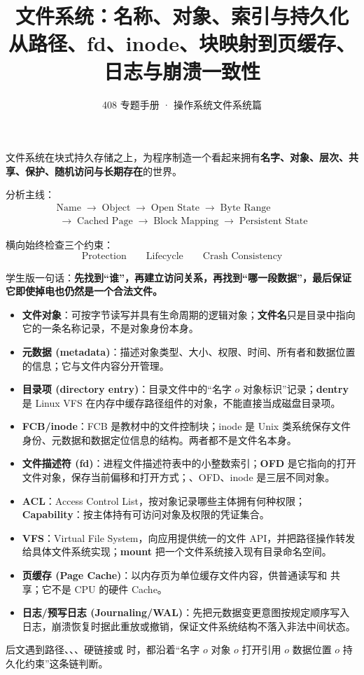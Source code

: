\documentclass[11pt,a4paper]{ctexart}
\title{\vspace{-1.2cm}\textbf{文件系统：名称、对象、索引与持久化}\\[0.35em]
\large 从路径、fd、inode、块映射到页缓存、日志与崩溃一致性}
\author{408 专题手册 · 操作系统文件系统篇}
\date{}
\newcommand{\kw}[1]{\textbf{#1}}
\newcommand{\code}[1]{\texttt{\detokenize{#1}}}
\newcommand{\arr}{\;\longrightarrow\;}
\begin{document}
\maketitle

\begin{corebox}
文件系统在块式持久存储之上，为程序制造一个看起来拥有\kw{名字、对象、层次、共享、保护、随机访问与长期存在}的世界。

分析主线：
\[
\boxed{\begin{aligned}
\text{Name}\arr\text{Object}\arr\text{Open State}\arr\text{Byte Range}\\
\arr\text{Cached Page}\arr\text{Block Mapping}\arr\text{Persistent State}
\end{aligned}}
\]

横向始终检查三个约束：
\[
\boxed{\text{Protection}}\qquad
\boxed{\text{Lifecycle}}\qquad
\boxed{\text{Crash Consistency}}
\]

学生版一句话：\kw{先找到“谁”，再建立访问关系，再找到“哪一段数据”，最后保证它即使掉电也仍然是一个合法文件。}
\end{corebox}

\begin{method}
\begin{itemize}[leftmargin=1.5em]
  \item \kw{文件对象}：可按字节读写并具有生命周期的逻辑对象；\kw{文件名}只是目录中指向它的一条名称记录，不是对象身份本身。
  \item \kw{元数据 (metadata)}：描述对象类型、大小、权限、时间、所有者和数据位置的信息；它与文件内容分开管理。
  \item \kw{目录项 (directory entry)}：目录文件中的“名字 $	o$ 对象标识”记录；\kw{dentry} 是 Linux VFS 在内存中缓存路径组件的对象，不能直接当成磁盘目录项。
  \item \kw{FCB/inode}：FCB 是教材中的文件控制块；inode 是 Unix 类系统保存文件身份、元数据和数据定位信息的结构。两者都不是文件名本身。
  \item \kw{文件描述符 (fd)}：进程文件描述符表中的小整数索引；\kw{OFD} 是它指向的打开文件对象，保存当前偏移和打开方式；\code{fd}、OFD、inode 是三层不同对象。
  \item \kw{ACL}：Access Control List，按对象记录哪些主体拥有何种权限；\kw{Capability}：按主体持有可访问对象及权限的凭证集合。
  \item \kw{VFS}：Virtual File System，向应用提供统一的文件 API，并把路径操作转发给具体文件系统实现；\kw{mount} 把一个文件系统接入现有目录命名空间。
  \item \kw{页缓存 (Page Cache)}：以内存页为单位缓存文件内容，供普通读写和 \code{mmap} 共享；它不是 CPU 的硬件 Cache。
  \item \kw{日志/预写日志 (Journaling/WAL)}：先把元数据变更意图按规定顺序写入日志，崩溃恢复时据此重放或撤销，保证文件系统结构不落入非法中间状态。
\end{itemize}
后文遇到路径、\code{open}、\code{fork}、硬链接或 \code{mmap} 时，都沿着“名字 $	o$ 对象 $	o$ 打开引用 $	o$ 数据位置 $	o$ 持久化约束”这条链判断。
\end{method}
\end{document}
